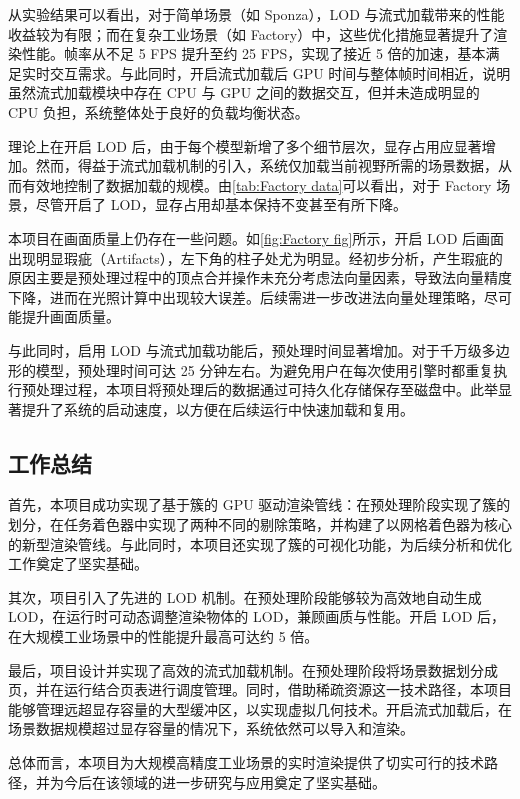 从实验结果可以看出，对于简单场景（如 Sponza），LOD 与流式加载带来的性能收益较为有限；而在复杂工业场景（如 Factory）中，这些优化措施显著提升了渲染性能。帧率从不足 5 FPS 提升至约 25 FPS，实现了接近 5 倍的加速，基本满足实时交互需求。与此同时，开启流式加载后 GPU 时间与整体帧时间相近，说明虽然流式加载模块中存在 CPU 与 GPU 之间的数据交互，但并未造成明显的 CPU 负担，系统整体处于良好的负载均衡状态。

理论上在开启 LOD 后，由于每个模型新增了多个细节层次，显存占用应显著增加。然而，得益于流式加载机制的引入，系统仅加载当前视野所需的场景数据，从而有效地控制了数据加载的规模。由\autoref{tab:Factory data}可以看出，对于 Factory 场景，尽管开启了 LOD，显存占用却基本保持不变甚至有所下降。

本项目在画面质量上仍存在一些问题。如\autoref{fig:Factory fig}所示，开启 LOD 后画面出现明显瑕疵（Artifacts），左下角的柱子处尤为明显。经初步分析，产生瑕疵的原因主要是预处理过程中的顶点合并操作未充分考虑法向量因素，导致法向量精度下降，进而在光照计算中出现较大误差。后续需进一步改进法向量处理策略，尽可能提升画面质量。

与此同时，启用 LOD 与流式加载功能后，预处理时间显著增加。对于千万级多边形的模型，预处理时间可达 25 分钟左右。为避免用户在每次使用引擎时都重复执行预处理过程，本项目将预处理后的数据通过可持久化存储保存至磁盘中\cite{cereal}。此举显著提升了系统的启动速度，以方便在后续运行中快速加载和复用。

\subsection{工作总结}

首先，本项目成功实现了基于簇的 GPU 驱动渲染管线：在预处理阶段实现了簇的划分，在任务着色器中实现了两种不同的剔除策略，并构建了以网格着色器为核心的新型渲染管线。与此同时，本项目还实现了簇的可视化功能，为后续分析和优化工作奠定了坚实基础。

其次，项目引入了先进的 LOD 机制。在预处理阶段能够较为高效地自动生成 LOD，在运行时可动态调整渲染物体的 LOD，兼顾画质与性能。开启 LOD 后，在大规模工业场景中的性能提升最高可达约 5 倍。

最后，项目设计并实现了高效的流式加载机制。在预处理阶段将场景数据划分成页，并在运行结合页表进行调度管理。同时，借助稀疏资源这一技术路径，本项目能够管理远超显存容量的大型缓冲区，以实现虚拟几何技术。开启流式加载后，在场景数据规模超过显存容量的情况下，系统依然可以导入和渲染。

总体而言，本项目为大规模高精度工业场景的实时渲染提供了切实可行的技术路径，并为今后在该领域的进一步研究与应用奠定了坚实基础。

